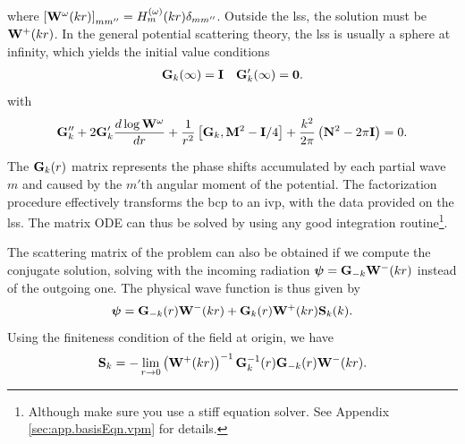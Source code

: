 where $\left[\mathbf{W}^{\omega}(kr)\right]_{mm''}=H_m^{(\omega)}(kr)\delta_{mm''}$.
Outside the \gls{lss}, the solution must be $\mathbf{W}^+(kr)$. In the general potential
scattering theory, the \gls{lss} is usually a sphere at infinity, which yields the 
initial value conditions
	\begin{align}
		\mathbf{G}_k(\infty)	&=\mathbf{I}	&	\mathbf{G}_k'(\infty)=\mathbf{0}.
	\end{align}
with 
	\begin{equation}
		\mathbf{G}_k''+2\mathbf{G}_k'\frac{d\log\mathbf{W}^\omega}{dr}+\frac{1}{r^2}\left[\mathbf{G}_k,\mathbf{M}^2-\mathbf{I}/4\right]
					+\frac{k^2}{2\pi}\left(\mathbf{N}^2-2\pi\mathbf{I}\right)=0.
	\end{equation}

The $\mathbf{G}_k(r)$ matrix represents the phase shifts accumulated by each partial wave $m$ 
and caused by the $m'$th angular moment of the potential. The factorization procedure 
effectively transforms the \gls{bcp} to an \gls{ivp}, with the data provided on the 
\gls{lss}. The matrix ODE can thus be solved by using any good integration routine\footnote{Although
make sure you use a stiff equation solver. See Appendix \ref{sec:app.basisEqn.vpm} for details.}.

The scattering matrix of the problem can also be obtained if we 
compute the conjugate solution, solving with the incoming radiation $\boldsymbol{\psi}=\mathbf{G}_{-k}\mathbf{W}^-(kr)$
instead of the outgoing one. The physical wave function is thus given by 
	\begin{equation}
		\boldsymbol{\psi} = \mathbf{G}_{-k}(r)\mathbf{W}^-(kr)+\mathbf{G}_k(r)\mathbf{W}^+(kr)\mathbf{S}_k(k).
	\end{equation}
Using the finiteness condition of the field at origin, we have
	\begin{equation}
		\mathbf{S}_k = -\lim_{r\rightarrow0}\left(\mathbf{W}^{+}(kr)\right)^{-1}\mathbf{G}_k^{-1}(r)\mathbf{G}_{-k}(r)\mathbf{W}^-(kr).
	\end{equation}

